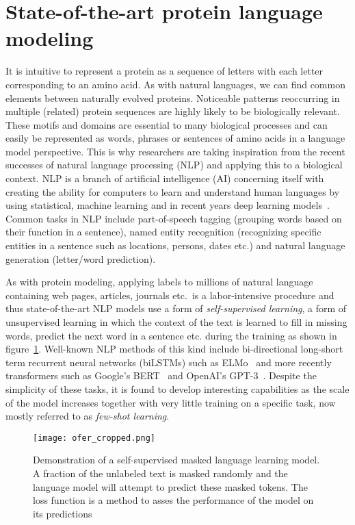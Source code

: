 \section{State-of-the-art protein language modeling}
\label{nlp}
It is intuitive to represent a protein as a sequence of letters with each letter corresponding to an amino acid. As with natural languages, we can find common elements between naturally evolved proteins. Noticeable patterns reoccurring in multiple (related) protein sequences are highly likely to be biologically relevant. These motifs and domains are essential to many biological processes and can easily be represented as words, phrases or sentences of amino acids in a language model perspective. This is why researchers are taking inspiration from the recent successes of natural language processing (NLP) and applying this to a biological context. NLP is a branch of artificial intelligence (AI) concerning itself with creating the ability for computers to learn and understand human languages by using statistical, machine learning and in recent years deep learning models~\cite{Ofer}. Common tasks in NLP include part-of-speech tagging (grouping words based on their function in a sentence), named entity recognition (recognizing specific entities in a sentence such as locations, persons, dates etc.) and natural language generation (letter/word prediction).

As with protein modeling, applying labels to millions of natural language containing web pages, articles, journals etc.\ is a labor-intensive procedure and thus state-of-the-art NLP models use a form of \textit{self-supervised learning}, a form of unsupervised learning in which the context of the text is learned to fill in missing words, predict the next word in a sentence etc. during the training as shown in figure~\ref{fig:ofer}. Well-known NLP methods of this kind include bi-directional long-short term recurrent neural networks (biLSTMs) such as ELMo~\cite{elmo} and more recently transformers such as Google's BERT~\cite{bert} and OpenAI's GPT-3~\cite{gpt3}. Despite the simplicity of these tasks, it is found to develop interesting capabilities as the scale of the model increases together with very little training on a specific task, now mostly referred to as \textit{few-shot learning}.

\begin{figure}[h]
    \centering
    \texttt{[image: ofer\_cropped.png]}
    \caption{Demonstration of a self-supervised masked language learning model. A fraction of the unlabeled text is masked randomly and the language model will attempt to predict these masked tokens. The loss function is a method to asses the performance of the model on its predictions}
    \label{fig:ofer}
\end{figure}

